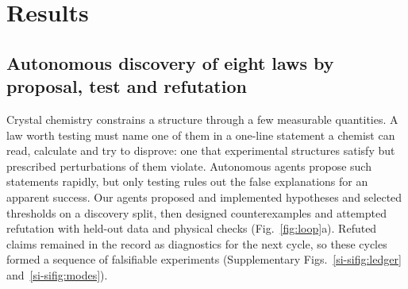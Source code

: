 \section{Results}

\subsection{Autonomous discovery of eight laws by proposal, test and refutation}
\label{sec:loop}

Crystal chemistry constrains a structure through a few measurable quantities. A law
worth testing must name one of them in a one-line statement a chemist can read,
calculate and try to disprove: one that experimental structures satisfy but prescribed
perturbations of them violate. Autonomous agents propose such
statements rapidly, but only testing rules out the false explanations for an apparent
success. Our
agents proposed and implemented hypotheses and selected thresholds on a discovery split, then
designed counterexamples and attempted refutation with held-out data and physical
checks (Fig.~\ref{fig:loop}a). Refuted claims remained in the record as diagnostics for
the next cycle, so these cycles formed a sequence of falsifiable experiments (Supplementary
Figs.~\ref{si-sifig:ledger} and~\ref{si-sifig:modes}).

